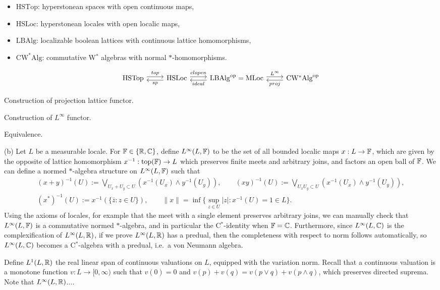 \documentclass{../../large}
\begin{document}
\begin{itemize}
\item $\mathrm{HSTop}$: hyperstonean spaces with open continuous maps,
\item $\mathrm{HSLoc}$: hyperstonean locales with open localic maps,
\item $\mathrm{LBAlg}$: localizable boolean lattices with continuous lattice homomorphisms,
\item $\mathrm{CW^*Alg}$: commutative W$^*$ algebras with normal $*$-homomorphisms.
\end{itemize}

\[\begin{tikzcd}
\mathrm{HSTop} \rar[shift left]{top}&
\mathrm{HSLoc} \lar[shift left]{sp}\rar[shift left]{clopen}&
\mathrm{LBAlg}^\op=\mathrm{MLoc} \lar[shift left]{ideal}\rar[shift left]{L^\infty}&
\mathrm{CW^*Alg}^\op \lar[shift left]{proj}
\end{tikzcd}\]


\begin{prb}[]
\begin{parts}
\item Construction of projection lattice functor.
\item Construction of $L^\infty$ functor.
\item Equivalence.
\end{parts}
\end{prb}
\begin{pf}
(b)
Let $L$ be a measurable locale.
For $\mathbb{F}\in\{\mathbb{R},\mathbb{C}\}$, define $L^\infty(L,\mathbb{F})$ to be the set of all bounded localic maps $x:L\to\mathbb{F}$, which are given by the opposite of lattice homomorphism $x^{-1}:\mathrm{top}(\mathbb{F})\to L$ which preserves finite meets and arbitrary joins, and factors an open ball of $\mathbb{F}$.
We can define a normed $*$-algebra structure on $L^\infty(L,\mathbb{F})$ such that
\begin{gather*}
(x+y)^{-1}(U):=\bigvee_{U_x+U_y\subset U}(x^{-1}(U_x)\wedge y^{-1}(U_y)),\qquad(xy)^{-1}(U):=\bigvee_{U_xU_y\subset U}(x^{-1}(U_x)\wedge y^{-1}(U_y)),\\
(x^*)^{-1}(U):=x^{-1}(\{\bar z:z\in U\}),\qquad\|x\|=\inf\{\sup_{z\in U}|z|:x^{-1}(U)=1\in L\}.
\end{gather*}
Using the axioms of locales, for example that the meet with a single element preserves arbitrary joins, we can manually check that $L^\infty(L,\mathbb{F})$ is a commutative normed $*$-algebra, and in particular the C$^*$-identity when $\mathbb{F}=\mathbb{C}$.
Furthermore, since $L^\infty(L,\mathbb{C})$ is the complexification of $L^\infty(L,\mathbb{R})$, if we prove $L^\infty(L,\mathbb{R})$ has a predual, then the completeness with respect to norm follows automatically, so $L^\infty(L,\mathbb{C})$ becomes a C$^*$-algebra with a predual, i.e.~a von Neumann algebra.

Define $L^1(L,\mathbb{R})$ the real linear span of continuous valuations on $L$, equipped with the variation norm.
Recall that a continuous valuation is a monotone function $v:L\to[0,\infty)$ such that $v(0)=0$ and $v(p)+v(q)=v(p\vee q)+v(p\wedge q)$, which preserves directed suprema.
Note that $L^\infty(L,\mathbb{R})$....
\end{pf}
\end{document}
